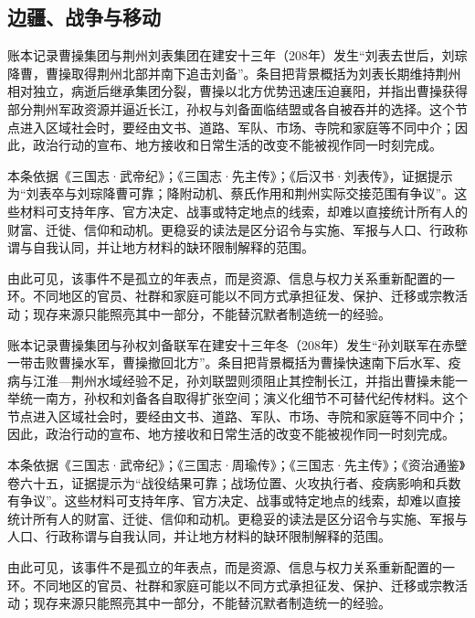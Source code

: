 \subsection{边疆、战争与移动}

账本记录曹操集团与荆州刘表集团在建安十三年（208年）发生“刘表去世后，刘琮降曹，曹操取得荆州北部并南下追击刘备”。条目把背景概括为刘表长期维持荆州相对独立，病逝后继承集团分裂，曹操以北方优势迅速压迫襄阳，并指出曹操获得部分荆州军政资源并逼近长江，孙权与刘备面临结盟或各自被吞并的选择。这个节点进入区域社会时，要经由文书、道路、军队、市场、寺院和家庭等不同中介；因此，政治行动的宣布、地方接收和日常生活的改变不能被视作同一时刻完成。

本条依据《三国志·武帝纪》；《三国志·先主传》；《后汉书·刘表传》，证据提示为“刘表卒与刘琮降曹可靠；降附动机、蔡氏作用和荆州实际交接范围有争议”。这些材料可支持年序、官方决定、战事或特定地点的线索，却难以直接统计所有人的财富、迁徙、信仰和动机。更稳妥的读法是区分诏令与实施、军报与人口、行政称谓与自我认同，并让地方材料的缺环限制解释的范围。

由此可见，该事件不是孤立的年表点，而是资源、信息与权力关系重新配置的一环。不同地区的官员、社群和家庭可能以不同方式承担征发、保护、迁移或宗教活动；现存来源只能照亮其中一部分，不能替沉默者制造统一的经验。

账本记录曹操集团与孙权刘备联军在建安十三年冬（208年）发生“孙刘联军在赤壁一带击败曹操水军，曹操撤回北方”。条目把背景概括为曹操快速南下后水军、疫病与江淮—荆州水域经验不足，孙刘联盟则须阻止其控制长江，并指出曹操未能一举统一南方，孙权和刘备各自取得扩张空间；演义化细节不可替代纪传材料。这个节点进入区域社会时，要经由文书、道路、军队、市场、寺院和家庭等不同中介；因此，政治行动的宣布、地方接收和日常生活的改变不能被视作同一时刻完成。

本条依据《三国志·武帝纪》；《三国志·周瑜传》；《三国志·先主传》；《资治通鉴》卷六十五，证据提示为“战役结果可靠；战场位置、火攻执行者、疫病影响和兵数有争议”。这些材料可支持年序、官方决定、战事或特定地点的线索，却难以直接统计所有人的财富、迁徙、信仰和动机。更稳妥的读法是区分诏令与实施、军报与人口、行政称谓与自我认同，并让地方材料的缺环限制解释的范围。

由此可见，该事件不是孤立的年表点，而是资源、信息与权力关系重新配置的一环。不同地区的官员、社群和家庭可能以不同方式承担征发、保护、迁移或宗教活动；现存来源只能照亮其中一部分，不能替沉默者制造统一的经验。

